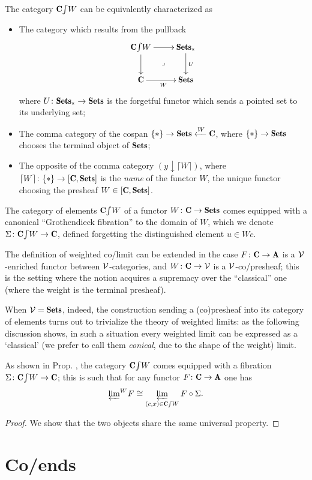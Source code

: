 \documentclass[a4paper,12pt]{amsart}
\def\yon{y}
\begin{document}
\begin{proposition}
The category $\elts{\C}{W}$ can be equivalently characterized as
\begin{itemize}
\item The category which results from the pullback 
\[
\xymatrix{
  \elts{\C}{W}\ar[r]\ar[d]\ar@{}[dr]|\lrcorner & \Sets_* \ar[d]^U \\
  \C \ar[r]_W & \Sets
}
\]
where $U\colon \Sets_*\to\Sets$ is the forgetful functor which sends a pointed set to its underlying set;
\item The comma category of the cospan $\{*\}\to \Sets \xot{W} \C$, where $\{*\}\to \Sets$ chooses the terminal object of $\Sets$;
\item The opposite of the comma category $(\yon\downarrow \lceil W\rceil)$, where $\lceil W\rceil\colon \{*\}\to [\C, \Sets]$ is the \emph{name} of the functor $W$, \ie the unique functor choosing the presheaf $W\in [\C, \Sets]$.
\end{itemize}
\end{proposition}
\begin{proposition}\label{fibelem}
The category of elements $\elts{\C}{W}$ of a functor $W\colon \C\to \Sets$ comes equipped with a canonical ``Grothendieck fibration'' to the domain of $W$, which we denote $\Sigma\colon \elts{\C}{W}\to \C$, defined forgetting the distinguished element $u\in Wc$. 
\end{proposition}
\begin{remark}
The definition of weighted co/limit can be extended in the case $F\colon \C\to\A$ is a $\mathcal{V}$-enriched functor between $\mathcal{V}$-categories, and $W\colon \C\to\V$ is a $\mathcal{V}$-co/presheaf; this is the setting where the notion acquires a supremacy over the ``classical'' one (where the weight is the terminal presheaf). 

When $\V=\Sets$, indeed, the construction sending a (co)presheaf into its category of elements turns out to trivialize the theory of weighted limits: as the following discussion shows, in such a situation every weighted limit can be expressed as a `classical' (we prefer to call them \emph{conical}, due to the shape of the weight) limit.
\end{remark}
\begin{proposition}\label{elementi}
As shown in Prop\@. , the category $\elts{\C}{W}$ comes equipped with a fibration $\Sigma\colon \elts{\C}{W}\to\C$; this is such that for any functor $F\colon \C\to \A$ one has 
\[\wlim{W}F\cong \varprojlim_{(c,x)\in \elts{\C}{W}} F\circ \Sigma.\]
\end{proposition}
\begin{proof}
We show that the two objects share the same universal property.
\end{proof}
\section{Co/ends}
\end{document}
